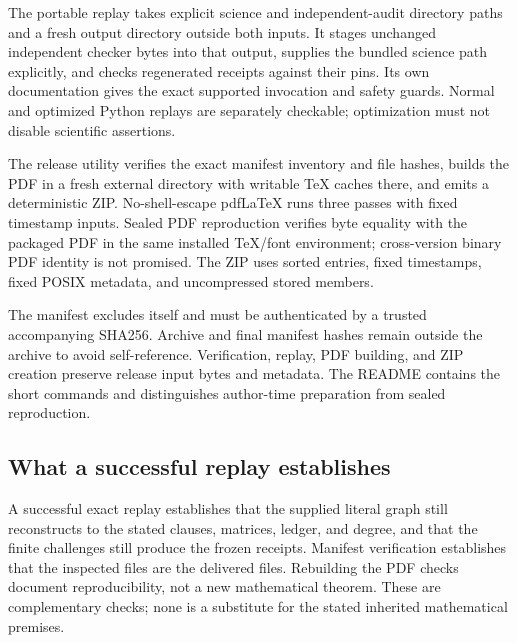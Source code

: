 \documentclass[11pt,letterpaper]{article}
\theoremstyle{definition}
\theoremstyle{remark}
\begin{document}
The portable replay takes explicit science and independent-audit directory paths and a fresh output directory outside both inputs. It stages unchanged independent checker bytes into that output, supplies the bundled science path explicitly, and checks regenerated receipts against their pins. Its own documentation gives the exact supported invocation and safety guards. Normal and optimized Python replays are separately checkable; optimization must not disable scientific assertions.

The release utility verifies the exact manifest inventory and file hashes, builds the PDF in a fresh external directory with writable TeX caches there, and emits a deterministic ZIP. No-shell-escape pdfLaTeX runs three passes with fixed timestamp inputs. Sealed PDF reproduction verifies byte equality with the packaged PDF in the same installed TeX/font environment; cross-version binary PDF identity is not promised. The ZIP uses sorted entries, fixed timestamps, fixed POSIX metadata, and uncompressed stored members.

The manifest excludes itself and must be authenticated by a trusted accompanying SHA256. Archive and final manifest hashes remain outside the archive to avoid self-reference. Verification, replay, PDF building, and ZIP creation preserve release input bytes and metadata. The README contains the short commands and distinguishes author-time preparation from sealed reproduction.

\subsection{What a successful replay establishes}
A successful exact replay establishes that the supplied literal graph still reconstructs to the stated clauses, matrices, ledger, and degree, and that the finite challenges still produce the frozen receipts. Manifest verification establishes that the inspected files are the delivered files. Rebuilding the PDF checks document reproducibility, not a new mathematical theorem. These are complementary checks; none is a substitute for the stated inherited mathematical premises.
\end{document}
